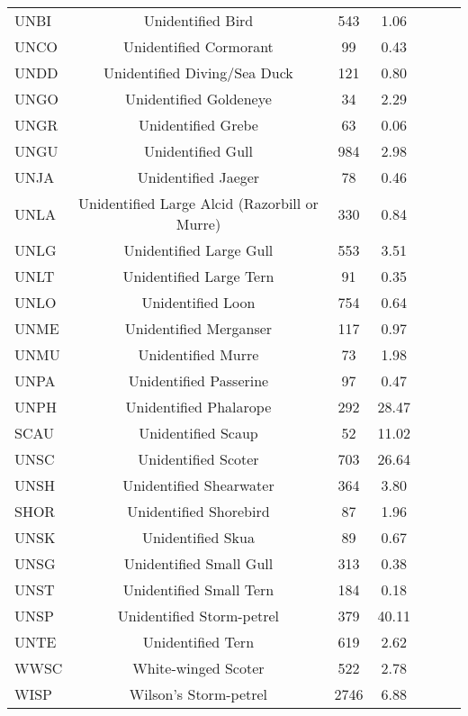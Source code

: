 \documentclass{statsoc}
\begin{document}
{\begin{longtable}{| l | c | c | c | c | c | c | }
UNBI &  Unidentified Bird & 543 & 1.06 &  &  &  \\ 
UNCO &  Unidentified Cormorant & 99 & 0.43  &  &  &  \\ 
UNDD &  Unidentified Diving/Sea Duck & 121 & 0.80 &  &  &  \\ 
UNGO &  Unidentified Goldeneye & 34 & 2.29 &  &  &  \\ 
UNGR &  Unidentified Grebe & 63 & 0.06 &  &  &  \\ 
UNGU &  Unidentified Gull & 984 & 2.98 &  &  &  \\ 
UNJA &  Unidentified Jaeger & 78 & 0.46 & &  &  \\ 
UNLA &  Unidentified Large Alcid (Razorbill or Murre) & 330 & 0.84 &  &  &  \\ 
UNLG &  Unidentified Large Gull & 553 & 3.51  &  &  &  \\ 
UNLT &  Unidentified Large Tern & 91 & 0.35 & &  &  \\ 
UNLO &  Unidentified Loon & 754 & 0.64 &  &  &  \\ 
UNME &  Unidentified Merganser & 117 & 0.97 &  &  &  \\ 
UNMU &  Unidentified Murre & 73 & 1.98 & &  &  \\ 
UNPA &  Unidentified Passerine & 97 & 0.47 &  &  &  \\ 
UNPH &  Unidentified Phalarope & 292 & 28.47 &  &  &  \\ 
SCAU &  Unidentified Scaup & 52 & 11.02  & &  &  \\ 
UNSC &  Unidentified Scoter & 703 & 26.64 &  &  &  \\ 
UNSH &  Unidentified Shearwater & 364 & 3.80 & &  &  \\ 
SHOR &  Unidentified Shorebird & 87 & 1.96 &  &  &  \\ 
UNSK &  Unidentified Skua & 89 & 0.67 &  &  &  \\ 
UNSG &  Unidentified Small Gull & 313 & 0.38  &  &  &  \\ 
UNST &  Unidentified Small Tern & 184 & 0.18 &  &  &  \\ 
UNSP &  Unidentified Storm-petrel & 379 & 40.11 & &  &  \\ 
UNTE &  Unidentified Tern & 619 & 2.62 &  &  &  \\ 
WWSC &  White-winged Scoter & 522 & 2.78 &  &  &   \\ 
WISP &  Wilson's Storm-petrel & 2746 & 6.88 &  &  &  \\ 
\hline 
\end{longtable}}
\end{document}
